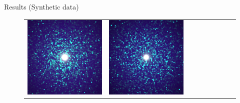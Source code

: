 \documentclass[final]{beamer}
\newlength{\twocolwid}
\newlength{\resultwidth}
\begin{document}
\begin{frame}[t]
\begin{columns}[t]
\begin{column}{\twocolwid}
\begin{block}{Results (Synthetic data)}
\begin{figure}[t]
\begin{tabular}{ccrclcccc}
            		\includegraphics[width=\resultwidth]{images/synth/flake/good3.jpg} &
            		\includegraphics[width=\resultwidth]{images/synth/flake/bad1.jpg}
            		\\

\end{tabular}
\end{figure}
\end{block}
\end{column}
\end{columns}
\end{frame}
\end{document}
